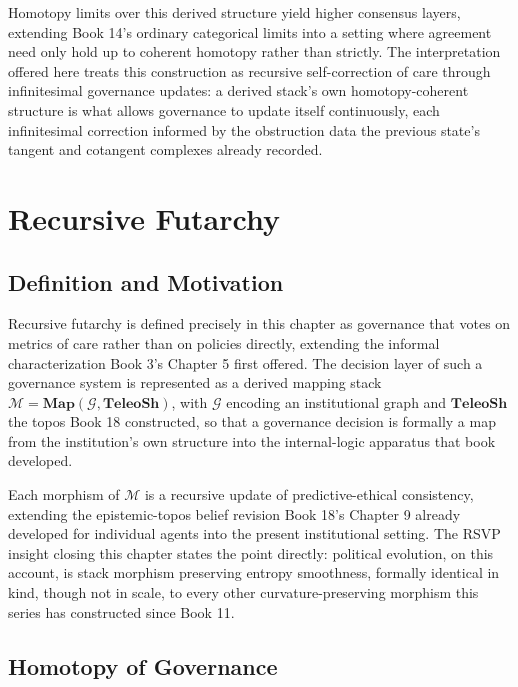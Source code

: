 Homotopy limits over this derived structure yield higher consensus layers, extending Book 14's ordinary categorical limits into a setting where agreement need only hold up to coherent homotopy rather than strictly. The interpretation offered here treats this construction as recursive self-correction of care through infinitesimal governance updates: a derived stack's own homotopy-coherent structure is what allows governance to update itself continuously, each infinitesimal correction informed by the obstruction data the previous state's tangent and cotangent complexes already recorded.

\part{Recursive Futarchy}

\chapter{Definition and Motivation}

Recursive futarchy is defined precisely in this chapter as governance that votes on metrics of care rather than on policies directly, extending the informal characterization Book 3's Chapter 5 first offered. The decision layer of such a governance system is represented as a derived mapping stack $\mathcal{M} = \mathbf{Map}(\mathcal{G}, \mathbf{TeleoSh})$, with $\mathcal{G}$ encoding an institutional graph and $\mathbf{TeleoSh}$ the topos Book 18 constructed, so that a governance decision is formally a map from the institution's own structure into the internal-logic apparatus that book developed.

Each morphism of $\mathcal{M}$ is a recursive update of predictive-ethical consistency, extending the epistemic-topos belief revision Book 18's Chapter 9 already developed for individual agents into the present institutional setting. The RSVP insight closing this chapter states the point directly: political evolution, on this account, is stack morphism preserving entropy smoothness, formally identical in kind, though not in scale, to every other curvature-preserving morphism this series has constructed since Book 11.

\chapter{Homotopy of Governance}

